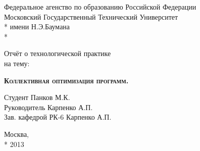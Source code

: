 \begin{titlepage}
    \newpage
    
    \begin{center}
        Федеральное агенство по образованию Российской Федерации \\
        Московский Государственный Технический Университет \\*
        имени Н.Э.Баумана \\*
        \vspace{-12mm}
        \begin{figure}[h]
        \end{figure}
        \vspace{-16mm}
        \hrulefill
    \end{center}
    \begin{center}
        \Large Отчёт о технологической практике\\ на тему:
    \end{center}
    
    \vspace{2.5em}
    
    \begin{center}
        \textsc{\textbf{Коллективная оптимизация программ.}}
    \end{center}
    
    \vspace{6em}
    
    \begin{flushleft}
        Студент \hrulefill Панков М.К. \\
        \vspace{1.5em}
        Руководитель \hrulefill Карпенко А.П.\\
        \vspace{1.5em}
        Зав. кафедрой РК-6 \hrulefill Карпенко А.П.
    \end{flushleft}
    
    \vspace{\fill}
    
    \begin{center}
        Москва, \\*
        2013
    \end{center}

\end{titlepage}